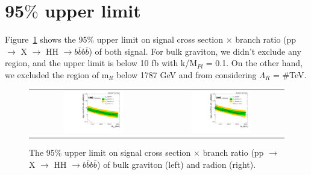 \clearpage
\section{95$\% $ upper limit}
Figure~\ref{fig:61} shows the 95$\% $ upper limit on signal cross section $\times $ branch ratio (pp $\rightarrow$ X $\rightarrow$ HH $\rightarrow b\bar{b}b\bar{b}$) of both signal. For bulk graviton, we didn't exclude any region, and the upper limit is below 10 fb with k/M$_{Pl}$ = 0.1. On the other hand, we excluded the region of m$_{R}$ below 1787 GeV and from   considering $\Lambda_{R}$ = #TeV.

 \begin{figure}[t]
  \centering
 \begin{tabular}{cc}
    \includegraphics[width=0.5\textwidth]{Figures/central_CW/limit.pdf} &
   \includegraphics[width=0.5\textwidth]{Figures/central_CW_rd/limit.pdf} \\
  \end{tabular}
  \caption{The 95$\% $ upper limit on signal cross section $\times $ branch ratio (pp $\rightarrow$ X $\rightarrow$ HH $\rightarrow b\bar{b}b\bar{b}$) of bulk graviton (left) and radion (right).}
  \label{fig:61}
\end{figure} 

